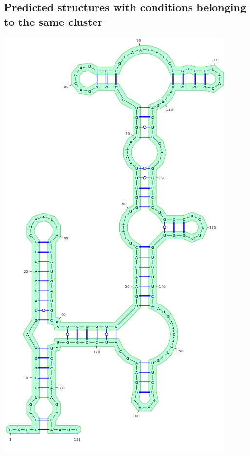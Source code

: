 \documentclass[11pt]{article} %
\begin{document}
\subsection{Predicted structures with conditions belonging to the same cluster}
{\centering \includegraphics[width=.4\linewidth]{graphs/Supp_structures/1M7ILUMg_1M7ILU3Mg}\\}
\end{document}
